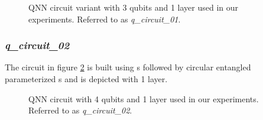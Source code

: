 \begin{figure}[!h]
	\centering
	\caption{QNN circuit variant with 3 qubits and 1 layer used in our experiments. Referred to as \textit{q\_circuit\_01}.}
	\label{figure:qnn_quantum_circuit_01}
\end{figure}

\subsubsection{\textit{q\_circuit\_02}}
\label{subsubsection:qnn_quantum_circuit_02}
The circuit in figure \ref{figure:qnn_quantum_circuit_02} is built using \rygate s followed by circular entangled parameterized \crygate s and is depicted with 1 layer.

\begin{figure}[!h]
	\centering
	\caption{QNN circuit with 4 qubits and 1 layer used in our experiments. Referred to as \textit{q\_circuit\_02}.}
	\label{figure:qnn_quantum_circuit_02}
\end{figure}


